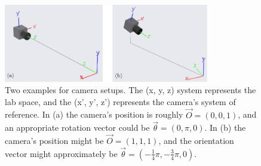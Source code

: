 \documentclass[10pt,a4paper]{article}
\begin{document}
\vspace{.25cm}

\begin{figure}
	\centering
	\includegraphics[width=0.8\textwidth]{Cam_pos_examples.pdf}
	\caption{Two examples for camera setups. The (x, y, z) system represents the lab space, and the (x', y', z') represents the camera's system of reference. In (a) the camera's position is roughly $\vec{O} = (0,0,1)$, and an appropriate rotation vector could be $\vec{\theta} = (0,\pi,0)$. In (b) the camera's position might be $\vec{O} = (1,1,1)$, and the orientation vector might approximately be $\vec{\theta} = (-\frac{1}{4}\pi,-\frac{3}{4}\pi,0)$. \label{fig:cam_pos_example}}
\end{figure}
\end{document}
